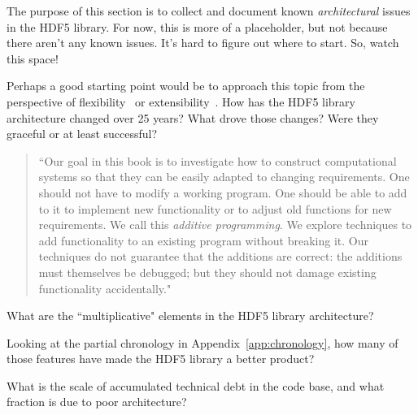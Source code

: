 



The purpose of this section is to collect and document known \textit{architectural} issues in the HDF5 library. For now, this is more of a placeholder, but not because there aren't any known issues. It's hard to figure out where to start. So, watch this space!

Perhaps a good starting point would be to approach this topic from the perspective of flexibility~\cite{hanson2021} or extensibility~\cite{Woods2018}. How has the HDF5 library architecture changed over 25 years? What drove those changes? Were they graceful or at least successful?

\begin{quote}
    ``Our goal in this book is to investigate how to construct computational systems so that they can be easily adapted to changing requirements. One should not have to modify a working program. One should be able to add to it to implement new functionality or to adjust old functions for new requirements. We call this \textit{additive programming}. We explore techniques to add functionality to an existing program without breaking it. Our techniques do not guarantee that the additions are correct: the additions must themselves be debugged; but they should not damage existing functionality accidentally."~\cite{hanson2021}
\end{quote}

What are the ``multiplicative" elements in the HDF5 library architecture?

Looking at the partial chronology in Appendix~\ref{app:chronology}, how many of those features have made the HDF5 library a better product?

What is the scale of accumulated technical debt in the code base, and what fraction is due to poor architecture?



